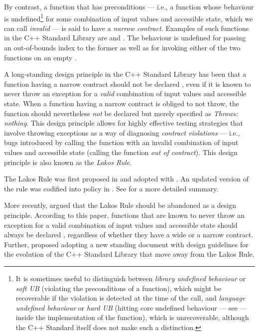 By contrast, a function that has preconditions --- i.e., a function whose behaviour is undefined\footnote{It is sometimes useful to distinguish between \emph{library undefined behaviour} or \emph{soft UB} (violating the preconditions of a function), which might be recoverable if the violation is detected at the time of the call, and \emph{language undefined behaviour} or \emph{hard UB} (hitting core undefined behaviour --- see \cite{P1705R1} --- inside the implementation of the function), which is unrecoverable, although the C++ Standard itself does not make such a distinction.} for some combination of input values and accessible state, which we can call \emph{invalid} --- is said to have a \emph{narrow contract}. Examples of such functions in the C++ Standard Library are  and . The behaviour is undefined for passing an out-of-bounds index to the former as well as for invoking either of the two functions on an empty .

A long-standing design principle in the C++ Standard Library has been that a function having a narrow contract should not be declared , even if it is known to never throw an exception for a \emph{valid} combination of input values and accessible state. When a function having a narrow contract is obliged to not throw, the function should nevertheless \emph{not} be declared  but merely specified as \emph{Throws: nothing}. %
This design principle allows for highly effective testing strategies that involve throwing exceptions as a way of diagnosing \emph{contract violations} --- i.e., bugs introduced by calling the function with an invalid combination of input values and accessible state (calling the function \emph{out of contract}). This design principle is also known as the \emph{Lakos Rule}.

The Lakos Rule was first proposed in \cite{N3248} and adopted with \cite{N3279}. An updated version of the rule was codified into policy in \cite{P0884R0}. See \cite{O'Dwyer2018} for a more detailed summary.

More recently, \cite{P1656R2} argued that the Lakos Rule should be abandoned as a design principle. According to this paper, functions that are known to never throw an exception for a valid combination of input values and accessible state should always be declared , regardless of whether they have a wide or a narrow contract. Further, \cite{P2148R0} proposed adopting a new standing document with design guidelines for the evolution of the C++ Standard Library that move away from the Lakos Rule.

